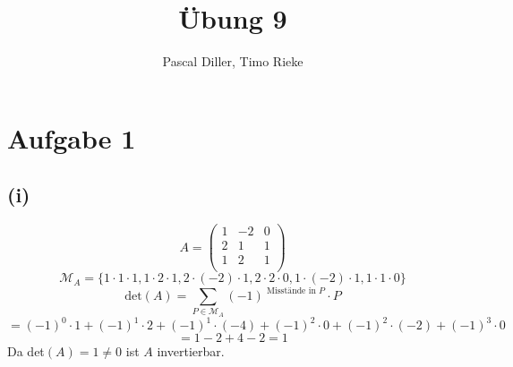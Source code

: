 \documentclass{article}
\title{Übung 9}
\author{Pascal Diller, Timo Rieke}
\begin{document}
\maketitle

\section{Aufgabe 1}
\subsection{(i)}
\[A = \begin{pmatrix}
    1 & -2 & 0 \\
    2 & 1 & 1 \\
    1 & 2 & 1 \\
\end{pmatrix}\]
\[\mathcal{M}_A = \{1 \cdot 1 \cdot 1, 1 \cdot 2 \cdot 1, 2 \cdot (-2) \cdot 1, 2 \cdot 2 \cdot 0, 1 \cdot (-2) \cdot 1, 1 \cdot 1 \cdot 0\} \]
\[\text{det}(A) = \sum_{P \in \mathcal{M}_A}^{} (-1)^{\text{ Misstände in } P} \cdot P \]
\[= (-1)^0 \cdot 1 + (-1)^1 \cdot 2 + (-1)^1 \cdot (-4) + (-1)^2 \cdot 0 + (-1)^2 \cdot (-2) + (-1)^3 \cdot 0\]
\[= 1 - 2 + 4 - 2 = 1\]
Da det$(A) = 1 \neq 0$ ist $A$ invertierbar.
\end{document}
